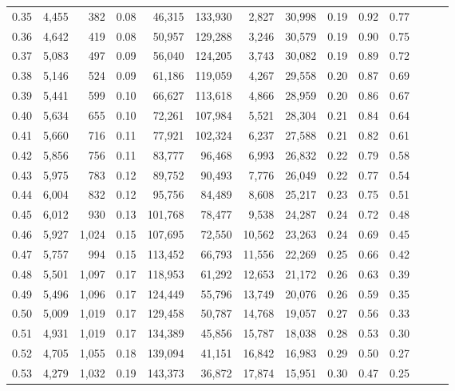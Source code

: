\begin{tabular}{rrrrrrrrrrrrrr}
0.35 &  4,455 &    382 &  0.08 &   46,315 &  133,930 &   2,827 &  30,998 &  0.19 &  0.92 &      0.77 \\
0.36 &  4,642 &    419 &  0.08 &   50,957 &  129,288 &   3,246 &  30,579 &  0.19 &  0.90 &      0.75 \\
0.37 &  5,083 &    497 &  0.09 &   56,040 &  124,205 &   3,743 &  30,082 &  0.19 &  0.89 &      0.72 \\
0.38 &  5,146 &    524 &  0.09 &   61,186 &  119,059 &   4,267 &  29,558 &  0.20 &  0.87 &      0.69 \\
0.39 &  5,441 &    599 &  0.10 &   66,627 &  113,618 &   4,866 &  28,959 &  0.20 &  0.86 &      0.67 \\
0.40 &  5,634 &    655 &  0.10 &   72,261 &  107,984 &   5,521 &  28,304 &  0.21 &  0.84 &      0.64 \\
0.41 &  5,660 &    716 &  0.11 &   77,921 &  102,324 &   6,237 &  27,588 &  0.21 &  0.82 &      0.61 \\
0.42 &  5,856 &    756 &  0.11 &   83,777 &   96,468 &   6,993 &  26,832 &  0.22 &  0.79 &      0.58 \\
0.43 &  5,975 &    783 &  0.12 &   89,752 &   90,493 &   7,776 &  26,049 &  0.22 &  0.77 &      0.54 \\
0.44 &  6,004 &    832 &  0.12 &   95,756 &   84,489 &   8,608 &  25,217 &  0.23 &  0.75 &      0.51 \\
0.45 &  6,012 &    930 &  0.13 &  101,768 &   78,477 &   9,538 &  24,287 &  0.24 &  0.72 &      0.48 \\
0.46 &  5,927 &  1,024 &  0.15 &  107,695 &   72,550 &  10,562 &  23,263 &  0.24 &  0.69 &      0.45 \\
0.47 &  5,757 &    994 &  0.15 &  113,452 &   66,793 &  11,556 &  22,269 &  0.25 &  0.66 &      0.42 \\
0.48 &  5,501 &  1,097 &  0.17 &  118,953 &   61,292 &  12,653 &  21,172 &  0.26 &  0.63 &      0.39 \\
0.49 &  5,496 &  1,096 &  0.17 &  124,449 &   55,796 &  13,749 &  20,076 &  0.26 &  0.59 &      0.35 \\
0.50 &  5,009 &  1,019 &  0.17 &  129,458 &   50,787 &  14,768 &  19,057 &  0.27 &  0.56 &      0.33 \\
0.51 &  4,931 &  1,019 &  0.17 &  134,389 &   45,856 &  15,787 &  18,038 &  0.28 &  0.53 &      0.30 \\
0.52 &  4,705 &  1,055 &  0.18 &  139,094 &   41,151 &  16,842 &  16,983 &  0.29 &  0.50 &      0.27 \\
0.53 &  4,279 &  1,032 &  0.19 &  143,373 &   36,872 &  17,874 &  15,951 &  0.30 &  0.47 &      0.25 \\

\end{tabular}
